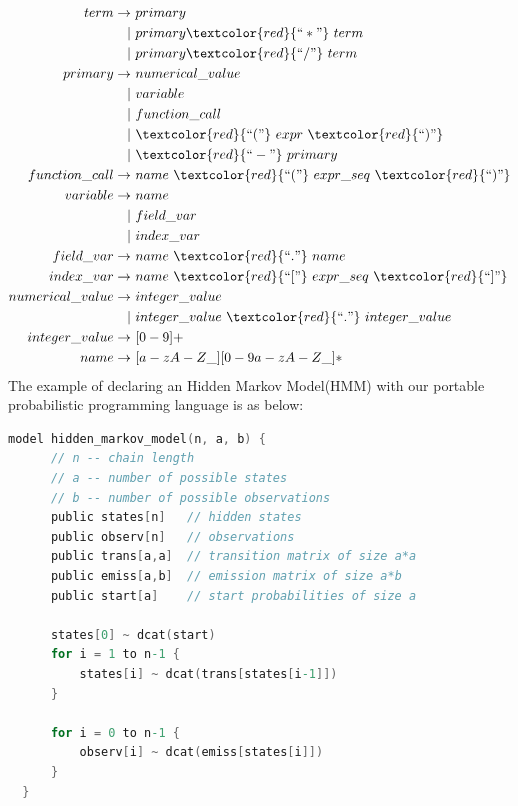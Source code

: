 \begin{align*}             
             term \rightarrow & ~primary \\  
                   |& ~primary \textcolor{red}{``*"} ~term \\
                   |& ~primary \textcolor{red}{``/"} ~term \\
          primary \rightarrow & ~numerical\_value \\
                   |& ~variable \\
                   |& ~function\_call \\
                   |& ~\textcolor{red}{``("} ~expr ~\textcolor{red}{``)"} \\
                   |& ~\textcolor{red}{``-"} ~primary \\           
    function\_call \rightarrow & ~name ~\textcolor{red}{``("} ~expr\_seq ~\textcolor{red}{``)"} \\           
         variable \rightarrow & ~name \\
                   |& ~field\_var \\
                   |& ~index\_var \\              
        field\_var \rightarrow & ~name ~\textcolor{red}{``."} ~name \\
        index\_var \rightarrow & ~name ~\textcolor{red}{``["} ~expr\_seq ~\textcolor{red}{``]"} \\           
  numerical\_value \rightarrow & ~integer\_value \\
                   |& ~integer\_value ~\textcolor{red}{``."} ~integer\_value \\                  
    integer\_value \rightarrow & ~[0-9]+ \\            
             name \rightarrow & ~[a-zA-Z\_][0-9a-zA-Z\_]*
\end{align*}
The example of declaring an Hidden Markov Model(HMM) with our portable probabilistic programming language is as below:

\noindent\begin{minipage}{\textwidth}
\begin{lstlisting}[language=C]
  model hidden_markov_model(n, a, b) {
      // n -- chain length
      // a -- number of possible states
      // b -- number of possible observations
      public states[n]   // hidden states
      public observ[n]   // observations
      public trans[a,a]  // transition matrix of size a*a
      public emiss[a,b]  // emission matrix of size a*b
      public start[a]    // start probabilities of size a
 
      states[0] ~ dcat(start)
      for i = 1 to n-1 {
          states[i] ~ dcat(trans[states[i-1]])
      }
 
      for i = 0 to n-1 {
          observ[i] ~ dcat(emiss[states[i]])
      }
  }
\end{lstlisting}
\end{minipage}

